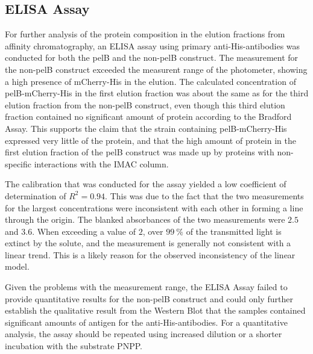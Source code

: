 \documentclass[a4paper,12pt]{article}
\begin{document}
\subsection{ELISA Assay}
For further analysis of the protein composition in the elution fractions from affinity chromatography, an ELISA assay using primary anti-His-antibodies was conducted for both the pelB and the non-pelB construct. The measurement for the non-pelB construct exceeded the measurent range of the photometer, showing a high presence of mCherry-His in the elution. The calculated concentration of pelB-mCherry-His in the first elution fraction was about the same as for the third elution fraction from the non-pelB construct, even though this third elution fraction contained no significant amount of protein according to the Bradford Assay. This supports the claim that the strain containing pelB-mCherry-His expressed very little of the protein, and that the high amount of protein in the first elution fraction of the pelB construct was made up by proteins with non-specific interactions with the IMAC column. 

The calibration that was conducted for the assay yielded a low coefficient of determination of $R^2=0.94$. This was due to the fact that the two measurements for the largest concentrations were inconsistent with each other in forming a line through the origin. The blanked absorbances of the two measurements were $2.5$ and $3.6$. When exceeding a value of $2$, over $99~\%$ of the transmitted light is extinct by the solute, and the measurement is generally not consistent with a linear trend. This is a likely reason for the observed inconsistency of the linear model.

Given the problems with the measurement range, the ELISA Assay failed to provide quantitative results for the non-pelB construct and could only further establish the qualitative result from the Western Blot that the samples contained significant amounts of antigen for the anti-His-antibodies. For a quantitative analysis, the assay should be repeated using increased dilution or a shorter incubation with the substrate PNPP.
\end{document}

